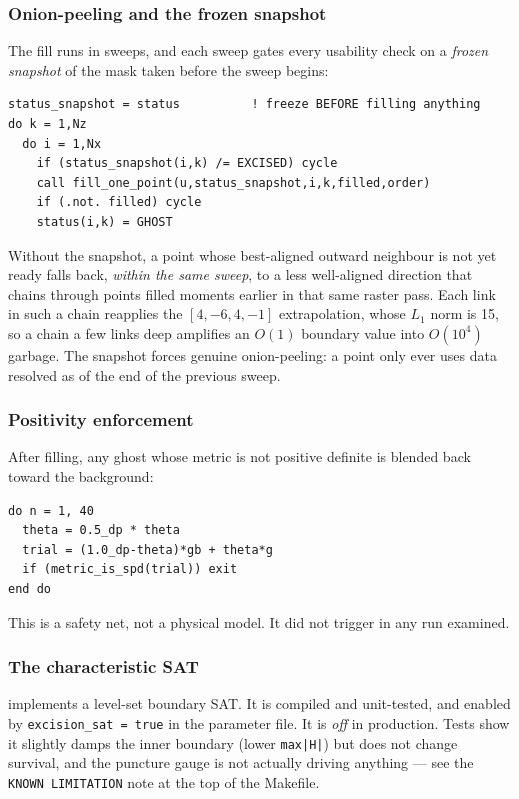 \subsubsection{Onion-peeling and the frozen snapshot}

The fill runs in sweeps, and each sweep gates every usability check on a
\emph{frozen snapshot} of the mask taken before the sweep begins:
\begin{lstlisting}
status_snapshot = status          ! freeze BEFORE filling anything
do k = 1,Nz
  do i = 1,Nx
    if (status_snapshot(i,k) /= EXCISED) cycle
    call fill_one_point(u,status_snapshot,i,k,filled,order)
    if (.not. filled) cycle
    status(i,k) = GHOST
\end{lstlisting}

\gotcha
Without the snapshot, a point whose best-aligned outward neighbour is not yet
ready falls back, \emph{within the same sweep}, to a less well-aligned
direction that chains through points filled moments earlier in that same raster
pass. Each link in such a chain reapplies the $[4,-6,4,-1]$ extrapolation, whose
$L_1$ norm is 15, so a chain a few links deep amplifies an $O(1)$ boundary
value into $O(10^4)$ garbage. The snapshot forces genuine onion-peeling: a
point only ever uses data resolved as of the end of the previous sweep.

\subsubsection{Positivity enforcement}

After filling, any ghost whose metric is not positive definite is blended back
toward the background:
\begin{lstlisting}
do n = 1, 40
  theta = 0.5_dp * theta
  trial = (1.0_dp-theta)*gb + theta*g
  if (metric_is_spd(trial)) exit
end do
\end{lstlisting}
This is a safety net, not a physical model. It did not trigger in any run
examined.

\subsubsection{The characteristic SAT}

 implements a level-set boundary SAT. It is
compiled and unit-tested, and enabled by \texttt{excision\_sat = true} in the
parameter file. It is \emph{off} in production. Tests show it slightly damps
the inner boundary (lower \texttt{max|H|}) but does not change survival, and the
puncture gauge is not actually driving anything --- see the
\texttt{KNOWN LIMITATION} note at the top of the Makefile.

